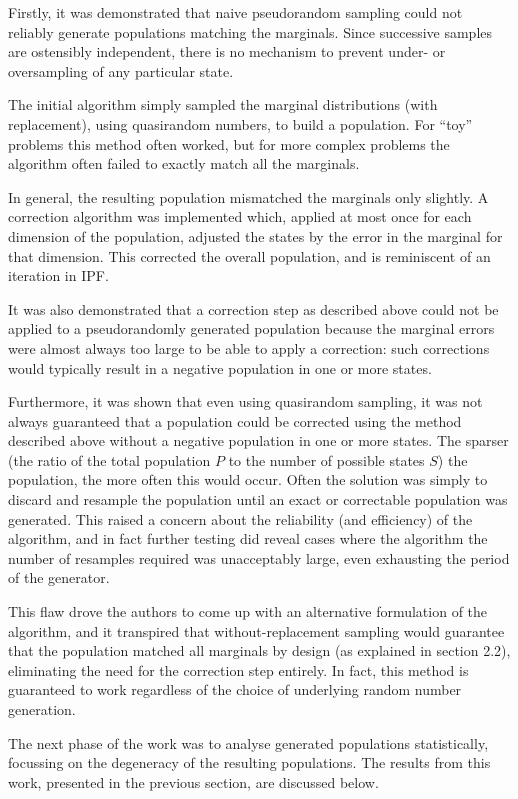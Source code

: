 \documentclass{JASSS}
\begin{document}
Firstly, it was demonstrated that naive pseudorandom sampling could not
reliably generate populations matching the marginals. Since successive
samples are ostensibly independent, there is no mechanism to prevent
under- or oversampling of any particular state.

The initial algorithm simply sampled the marginal distributions (with
replacement), using quasirandom numbers, to build a population. For
``toy'' problems this method often worked, but for more complex problems
the algorithm often failed to exactly match all the marginals.

In general, the resulting population mismatched the marginals only
slightly. A correction algorithm was implemented which, applied at most
once for each dimension of the population, adjusted the states by the
error in the marginal for that dimension. This corrected the overall
population, and is reminiscent of an iteration in IPF.

It was also demonstrated that a correction step as described above could
not be applied to a pseudorandomly generated population because the
marginal errors were almost always too large to be able to apply a
correction: such corrections would typically result in a negative
population in one or more states.

Furthermore, it was shown that even using quasirandom sampling, it was
not always guaranteed that a population could be corrected using the
method described above without a negative population in one or more
states. The sparser (the ratio of the total population \(P\) to the
number of possible states \(S\)) the population, the more often this
would occur. Often the solution was simply to discard and resample the
population until an exact or correctable population was generated. This
raised a concern about the reliability (and efficiency) of the
algorithm, and in fact further testing did reveal cases where the
algorithm the number of resamples required was unacceptably large, even
exhausting the period of the generator.

This flaw drove the authors to come up with an alternative formulation
of the algorithm, and it transpired that without-replacement sampling
would guarantee that the population matched all marginals by design (as
explained in section 2.2), eliminating the need for the correction step
entirely. In fact, this method is guaranteed to work regardless of the
choice of underlying random number generation.

The next phase of the work was to analyse generated populations
statistically, focussing on the degeneracy of the resulting populations.
The results from this work, presented in the previous section, are
discussed below.
\end{document}
